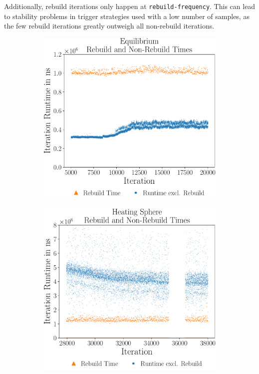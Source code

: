 Additionally, rebuild iterations only happen at \texttt{rebuild-frequency}. This can lead to stability problems in trigger strategies used with a low number of samples, as the few rebuild iterations greatly outweigh all non-rebuild iterations.

\begin{figure}[htpb]
	\centering
	\begin{subfigure}[t]{0.45\textwidth}
		\vskip0pt
		\centering
		\includegraphics[width=\textwidth]{./Figures/plots/equilibrium_rebuild.pdf}
	\end{subfigure}
	\hfill
	\begin{subfigure}[t]{0.45\textwidth}
		\vskip0pt
		\centering
		\includegraphics[width=\textwidth]{./Figures/plots/hs_rebuild.pdf}

\end{subfigure}
\end{figure}
